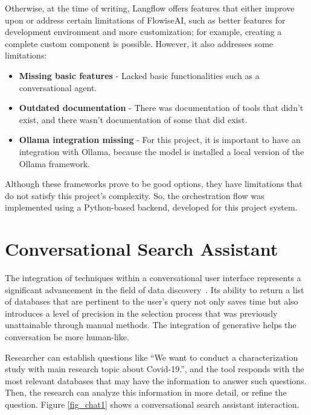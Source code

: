 Otherwise, at the time of writing, Langflow offers features that either improve upon or address certain limitations of FlowiseAI, such as better features for development environment and more customization; for example, creating a complete custom component is possible. However, it also addresses some limitations:

\begin{itemize}
	\item \textbf{Missing basic features} - Lacked basic functionalities such as a conversational agent.
	\item \textbf{Outdated documentation} - There was documentation of tools that didn't exist, and there wasn't documentation of some that did exist. 
	\item \textbf{Ollama integration missing} - For this project, it is important to have an integration with Ollama, because the {\llm} model is installed a local version of the Ollama framework.
\end{itemize}


Although these frameworks prove to be good options, they have limitations that do not satisfy this project's complexity. So, the {\llm} orchestration flow was implemented using a Python-based backend, developed for this project system.


\section{Conversational Search Assistant}

The integration of {\ir} techniques within a conversational user interface represents a significant advancement in the field of data discovery~\cite{ritzel2019development}. Its ability to return a list of databases that are pertinent to the user's query not only saves time but also introduces a level of precision in the selection process that was previously unattainable through manual methods. The integration of generative {\ai} helps the conversation be more human-like. %

Researcher can establish questions like ``We want to conduct a characterization study with main research topic about Covid-19.'', and the tool responds with the most relevant databases that may have the information to answer such questions. Then, the research can analyze this information in more detail, or refine the question. Figure \ref{fig_chat1} shows a conversational search assistant interaction.

